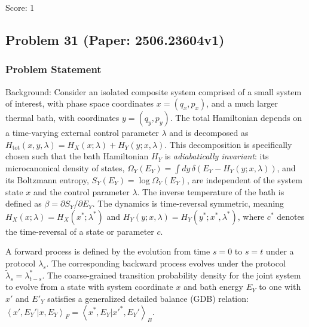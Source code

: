 \documentclass[10pt]{article}
\begin{document}
Score: 1

\newpage
\subsection*{Problem 31 (Paper: 2506.23604v1)}
\subsubsection*{Problem Statement}
Background:
Consider an isolated composite system comprised of a small system of interest, with phase space coordinates $x=(q_x, p_x)$, and a much larger thermal bath, with coordinates $y=(q_y, p_y)$. The total Hamiltonian depends on a time-varying external control parameter $\lambda$ and is decomposed as $H_{\text{tot}}(x, y, \lambda) = H_X(x; \lambda) + H_Y(y; x, \lambda)$. This decomposition is specifically chosen such that the bath Hamiltonian $H_Y$ is \textit{adiabatically invariant}: its microcanonical density of states, $\Omega_Y(E_Y) = \int dy\, \delta(E_Y - H_Y(y; x, \lambda))$, and its Boltzmann entropy, $S_Y(E_Y) = \log \Omega_Y(E_Y)$, are independent of the system state $x$ and the control parameter $\lambda$. The inverse temperature of the bath is defined as $\beta = \partial S_Y / \partial E_Y$. The dynamics is time-reversal symmetric, meaning $H_X(x; \lambda) = H_X(x^*; \lambda^*)$ and $H_Y(y; x, \lambda) = H_Y(y^*; x^*, \lambda^*)$, where $c^*$ denotes the time-reversal of a state or parameter $c$.

A forward process is defined by the evolution from time $s=0$ to $s=t$ under a protocol $\lambda_s$. The corresponding backward process evolves under the protocol $\tilde{\lambda}_s = \lambda_{t-s}^*$. The coarse-grained transition probability density for the joint system to evolve from a state with system coordinate $x$ and bath energy $E_Y$ to one with $x'$ and $E'_Y$ satisfies a generalized detailed balance (GDB) relation: $\left\langle x', E_Y' | x, E_Y \right\rangle_F = \left\langle x^*, E_Y | x'^*, E_Y' \right\rangle_B$.
\end{document}
